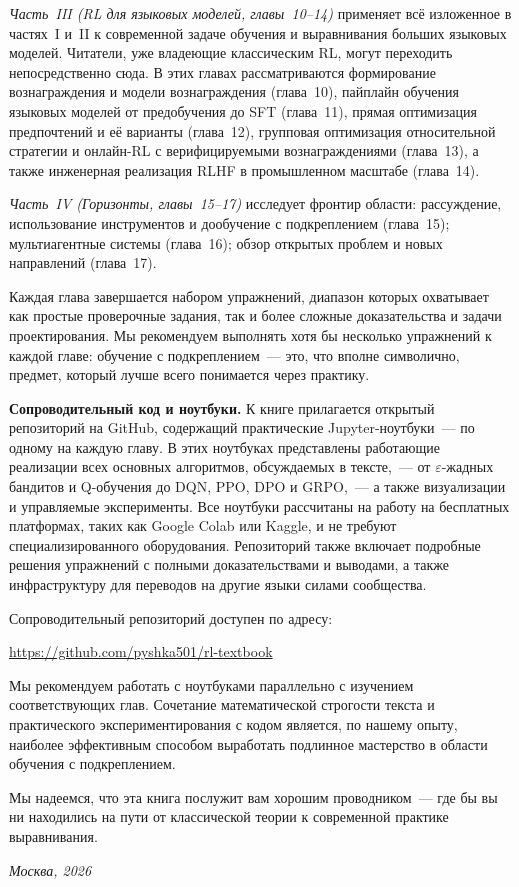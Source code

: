 \emph{Часть~III (RL для языковых моделей, главы~10--14)} применяет всё изложенное в частях~I и~II к современной задаче обучения и выравнивания больших языковых моделей. Читатели, уже владеющие классическим RL, могут переходить непосредственно сюда. В этих главах рассматриваются формирование вознаграждения и модели вознаграждения (глава~10), пайплайн обучения языковых моделей от предобучения до SFT (глава~11), прямая оптимизация предпочтений и её варианты (глава~12), групповая оптимизация относительной стратегии и онлайн-RL с верифицируемыми вознаграждениями (глава~13), а также инженерная реализация RLHF в промышленном масштабе (глава~14).

\emph{Часть~IV (Горизонты, главы~15--17)} исследует фронтир области: рассуждение, использование инструментов и дообучение с подкреплением (глава~15); мультиагентные системы (глава~16); обзор открытых проблем и новых направлений (глава~17).

Каждая глава завершается набором упражнений, диапазон которых охватывает как простые проверочные задания, так и более сложные доказательства и задачи проектирования. Мы рекомендуем выполнять хотя бы несколько упражнений к каждой главе: обучение с подкреплением~--- это, что вполне символично, предмет, который лучше всего понимается через практику.

\medskip

\textbf{Сопроводительный код и ноутбуки.}\quad
К книге прилагается открытый репозиторий на GitHub, содержащий практические Jupyter-ноутбуки~--- по одному на каждую главу. В этих ноутбуках представлены работающие реализации всех основных алгоритмов, обсуждаемых в тексте,~--- от $\varepsilon$-жадных бандитов и Q-обучения до DQN, PPO, DPO и GRPO,~--- а также визуализации и управляемые эксперименты. Все ноутбуки рассчитаны на работу на бесплатных платформах, таких как Google Colab или Kaggle, и не требуют специализированного оборудования. Репозиторий также включает подробные решения упражнений с полными доказательствами и выводами, а также инфраструктуру для переводов на другие языки силами сообщества.

Сопроводительный репозиторий доступен по адресу:

\medskip
\centerline{\url{https://github.com/pyshka501/rl-textbook}}
\medskip

\noindent
Мы рекомендуем работать с ноутбуками параллельно с изучением соответствующих глав. Сочетание математической строгости текста и практического экспериментирования с кодом является, по нашему опыту, наиболее эффективным способом выработать подлинное мастерство в области обучения с подкреплением.

\medskip

Мы надеемся, что эта книга послужит вам хорошим проводником~--- где бы вы ни находились на пути от классической теории к современной практике выравнивания.

\bigskip

\hfill\textit{Москва, 2026}
